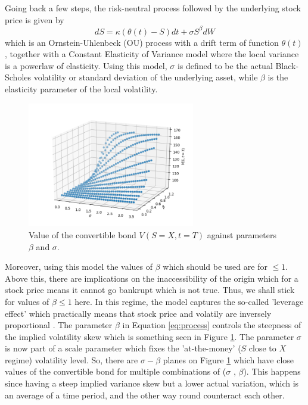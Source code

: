 \documentclass{article}
\begin{document}
Going back a few steps, the risk-neutral process followed by the underlying stock price is given by
 \begin{equation}
  dS = \kappa ( \theta (t)-S)dt+\sigma S^{\beta}dW
  \label{eq:process}
\end{equation}
which is an Ornstein-Uhlenbeck (OU) process \cite{thierfelder2015trending} with a drift term of function $\theta(t)$ , together with a Constant Elasticity of Variance \cite{cev} model where the local variance is a powerlaw of elasticity.
Using this model, $\sigma$ is defined to be the actual Black-Scholes volatility or standard deviation of the underlying asset, while $\beta$ is the elasticity parameter of the local volatility.
\begin{figure}[!bh]
\includegraphics[width=0.65\textwidth,center]{../images/3d_european_varying_s_varying_sigma_varying_beta.png}
\caption{Value of the convertible bond $V(S=X,t=T)$ against parameters $\beta$ and $\sigma$.}
\label{fig:3d_relationship}
\end{figure}
Moreover, using this model the values of $\beta$ which should be used are for $\leq1$.
Above this, there are implications on the inaccessibility of the origin which for a stock price means it cannot go bankrupt which is not true.
Thus, we shall stick for values of $\beta\leq1$ here.
In this regime, the model captures the so-called 'leverage effect' which practically means that stock price and volatily are inversely proportional \cite{chan}.
The parameter $\beta$ in Equation \ref{eq:process} controls the steepness of the implied volatility skew which is something seen in Figure \ref{fig:3d_relationship}.
The parameter $\sigma$ is now part of a scale parameter which fixes the 'at-the-money' ($S$ close to $X$ regime) volatility level.
So, there are $\sigma-\beta$ planes on Figure \ref{fig:3d_relationship} which have close values of the convertible bond for multiple combinations of ($\sigma$ , $\beta$).
This happens since having a steep implied variance skew but a lower actual variation, which is an average of a time period, and the other way round counteract each other.
\end{document}
